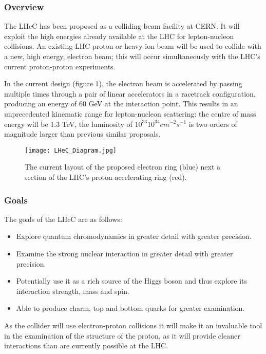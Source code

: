 \subsubsection{Overview \cite{LHeC:Birmingham}}

The LHeC has been proposed as a colliding beam facility at CERN. It will exploit the high energies already available at the LHC for lepton-nucleon collisions. An existing LHC proton or heavy ion beam will be used to collide with a new, high energy, electron beam; this will occur simultaneously with the LHC's current proton-proton experiments.
 
In the current design (figure 1), the electron beam is accelerated by passing multiple times through a pair of linear accelerators in a racetrack configuration, producing an energy of 60 GeV at the interaction point. This results in an unprecedented kinematic range for lepton-nucleon scattering: the centre of mass energy will be 1.3 TeV, the luminosity of $10^{33}$\textendash $10^{34} cm^{-2}s^{-1}$ is two orders of magnitude larger than previous similar proposals.

\begin{figure}[!htb]
\centering
\texttt{[image: LHeC\_Diagram.jpg]}
\caption{The current layout of the proposed electron ring (blue) next a section of the LHC's proton accelerating ring (red).
}
\end{figure}

\subsubsection{Goals}

The goals of the LHeC are as follows:
\begin{itemize}
\item Explore quantum chromodynamics in greater detail with greater precision.
\item Examine the strong nuclear interaction in greater detail with greater precision.
\item Potentially use it as a rich source of the Higgs boson and thus explore its interaction strength, mass and spin.
\item Able to produce charm, top and bottom quarks for greater examination.
\end{itemize}
As the collider will use electron-proton collisions it will make it an invaluable tool in the examination of the structure of the proton, as it will provide cleaner interactions than are currently possible at the LHC.
 
